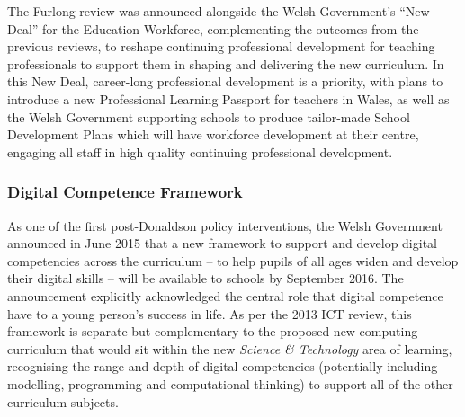 
The Furlong review was announced alongside the Welsh Government's ``New
Deal'' for the Education Workforce, complementing the outcomes from the
previous reviews, to reshape continuing professional development for
teaching professionals to support them in shaping and delivering the
new curriculum. In this New Deal, career-long professional development
is a priority, with plans to introduce a new Professional Learning
Passport for teachers in Wales, as well as the Welsh Government
supporting schools to produce tailor-made School Development Plans
which will have workforce development at their centre, engaging all
staff in high quality continuing professional development.

\subsubsection*{Digital Competence Framework}
As one of the first post-Donaldson policy interventions, the Welsh
Government announced in June 2015 that a new framework to support and
develop digital competencies across the curriculum -- to help pupils
of all ages widen and develop their digital skills -- will be
available to schools by September 2016. The announcement explicitly
acknowledged the central role that digital competence have to a young
person's success in life. As per the 2013 ICT review, this framework
is separate but complementary to the proposed new computing curriculum
that would sit within the new {\emph{Science \& Technology}} area of learning,
recognising the range and depth of digital competencies (potentially
including modelling, programming and computational thinking) to
support all of the other curriculum subjects.


